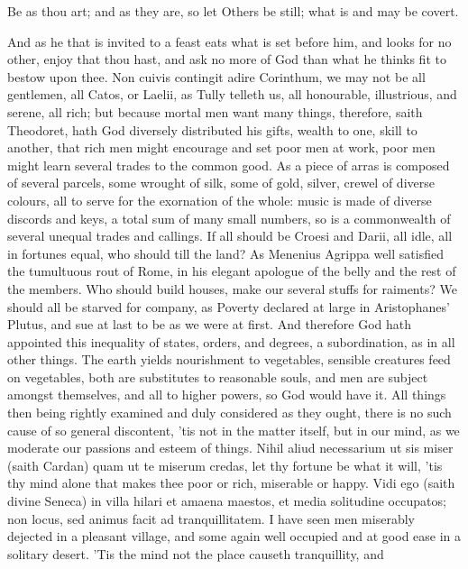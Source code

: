 {Be as thou art; and as they are, so let
Others be still; what is and may be covert.

And as he that is invited to a feast eats what is set before him,
and looks for no other, enjoy that thou hast, and ask no more of God
than what he thinks fit to bestow upon thee. Non cuivis contingit adire
Corinthum, we may not be all gentlemen, all Catos, or Laelii, as Tully
telleth us, all honourable, illustrious, and serene, all rich; but
because mortal men want many things, therefore, saith Theodoret,
hath God diversely distributed his gifts, wealth to one, skill to
another, that rich men might encourage and set poor men at work, poor
men might learn several trades to the common good. As a piece of arras
is composed of several parcels, some wrought of silk, some of gold,
silver, crewel of diverse colours, all to serve for the exornation of
the whole: music is made of diverse discords and keys, a total sum of
many small numbers, so is a commonwealth of several unequal trades and
callings. If all should be Croesi and Darii, all idle, all in
fortunes equal, who should till the land? As Menenius Agrippa
well satisfied the tumultuous rout of Rome, in his elegant apologue of
the belly and the rest of the members. Who should build houses, make
our several stuffs for raiments? We should all be starved for company,
as Poverty declared at large in Aristophanes' Plutus, and sue at last
to be as we were at first. And therefore God hath appointed this
inequality of states, orders, and degrees, a subordination, as in all
other things. The earth yields nourishment to vegetables, sensible
creatures feed on vegetables, both are substitutes to reasonable souls,
and men are subject amongst themselves, and all to higher powers, so
God would have it. All things then being rightly examined and duly
considered as they ought, there is no such cause of so general
discontent, 'tis not in the matter itself, but in our mind, as we
moderate our passions and esteem of things. Nihil aliud necessarium ut
sis miser (saith Cardan) quam ut te miserum credas, let thy
fortune be what it will, 'tis thy mind alone that makes thee poor or
rich, miserable or happy. Vidi ego (saith divine Seneca) in villa
hilari et amaena maestos, et media solitudine occupatos; non locus, sed
animus facit ad tranquillitatem. I have seen men miserably dejected in
a pleasant village, and some again well occupied and at good ease in a
solitary desert. 'Tis the mind not the place causeth tranquillity, and
}
